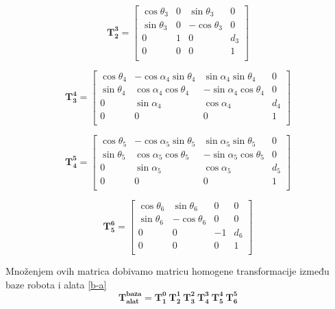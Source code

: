 \documentclass[times, utf8, diplomski, numeric]{fer}
\begin{document}
\begin{equation}
\mathbf{T_2^3} =\begin{bmatrix} \cos\theta_{3}& 0 & \sin\theta_{3} & 0\\ 
\sin\theta_{3}& 0 & -\cos\theta_{3} & 0\\
0 & 1 & 0 & d_{3}\\
0 & 0 & 0 & 1\\
\end{bmatrix}
\end{equation}

\begin{equation}
\mathbf{T_3^4} =\begin{bmatrix} \cos\theta_{4}& -\cos\alpha_{4}\sin\theta_{4} & \sin\alpha_{4}\sin\theta_{4} & 0\\ 
\sin\theta_{4}& \cos\alpha_{4}\cos\theta_{4} & -\sin\alpha_{4}\cos\theta_{4} & 0\\
0 & \sin\alpha_{4} & \cos\alpha_{4} & d_{4}\\
0 & 0 & 0 & 1\\
\end{bmatrix}
\end{equation}

\begin{equation}
\mathbf{T_4^5} =\begin{bmatrix} \cos\theta_{5}& -\cos\alpha_{5}\sin\theta_{5} & \sin\alpha_{5}\sin\theta_{5} & 0\\ 
\sin\theta_{5}& \cos\alpha_{5}\cos\theta_{5} & -\sin\alpha_{5}\cos\theta_{5} & 0\\
0 & \sin\alpha_{5} & \cos\alpha_{5} & d_{5}\\
0 & 0 & 0 & 1\\
\end{bmatrix}
\end{equation}

\begin{equation}
\mathbf{T_5^6} =\begin{bmatrix} \cos\theta_{6}& \sin\theta_{6} & 0 & 0\\ 
\sin\theta_{6}& -\cos\theta_{6} & 0 & 0\\ 
0 & 0 & -1 & d_{6}\\
0 & 0 & 0 & 1\\
\end{bmatrix}
\end{equation}

Množenjem ovih matrica dobivamo matricu homogene transformacije između baze robota i alata \ref{b-a}
\begin{equation}
\mathbf{T_{alat}^{baza}} = \mathbf{T_1^0}\ \mathbf{T_2^1}\ \mathbf{T_3^2}\ \mathbf{T_4^3}\ \mathbf{T_5^4}\ \mathbf{T_6^5}
\label{b-a}
\end{equation}
\end{document}
